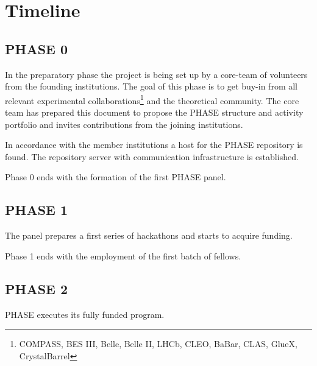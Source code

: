 \section{Timeline}

\subsection{PHASE 0}
In the preparatory phase the project is being set up by a core-team of volunteers from the founding institutions. The goal of this phase is to get buy-in from all relevant
experimental collaborations\footnote{COMPASS, BES III, Belle, Belle II, LHCb, CLEO, BaBar, CLAS, GlueX, CrystalBarrel} and the theoretical community.  The core team has prepared this document to propose the PHASE structure and activity portfolio and invites contributions from the joining institutions.

In accordance with the member institutions a host for the PHASE repository is found. The repository server with communication infrastructure is established.

Phase 0 ends with the formation of the first PHASE panel.

\subsection{PHASE 1}
The panel prepares a first series of hackathons and starts to acquire funding.

Phase 1 ends with the employment of the first batch of fellows.
\subsection{PHASE 2}
PHASE executes its fully funded program.